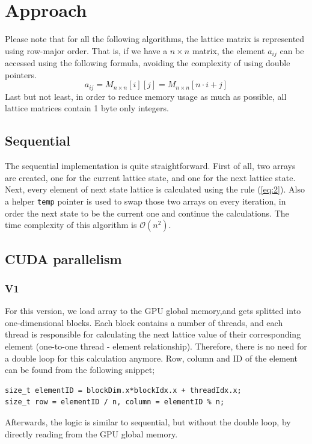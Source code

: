 \documentclass[11pt]{article}
\begin{document}
\section{Approach}
\label{sec:orge583755}
Please note that for all the following algorithms, the lattice matrix is represented using row-major order. That is, if we have a \(n \times n\) matrix, the element \(a_{ij}\) can be accessed using the following formula, avoiding the complexity of using double pointers.
\begin{equation}
\label{eq:1}
a_{ij} =  M_{n \times n}[i][j] = M_{n \times n}[n \cdot i + j]
\end{equation}
Last but not least, in order to reduce memory usage as much as possible, all lattice matrices contain 1 byte only integers.
\subsection{Sequential}
\label{sec:org02151c8}
The sequential implementation is quite straightforward. First of all, two arrays are created, one for the current lattice state, and one for the next lattice state. Next, every element of next state lattice is calculated using the rule (\ref{eq:2}). Also a helper \texttt{temp} pointer is used to swap those two arrays on every iteration, in order the next state to be the current one and continue the calculations. The time complexity of this algorithm is \(\mathcal{O}(n^{2})\).
\subsection{CUDA parallelism}
\label{sec:org242079d}
\subsubsection{V1}
\label{sec:orgca24658}
For this version, we load array to the GPU global memory,and gets splitted into one-dimensional blocks. Each block contains a number of threads, and each thread is responsible for calculating the next lattice value of their corresponding element (one-to-one thread - element relationship). Therefore, there is no need for a double loop for this calculation anymore. Row, column and ID of the element can be found from the following snippet;
\begin{verbatim}
size_t elementID = blockDim.x*blockIdx.x + threadIdx.x;
size_t row = elementID / n, column = elementID % n;
\end{verbatim}
Afterwards, the logic is similar to sequential, but without the double loop, by directly reading from the GPU global memory.
\end{document}
